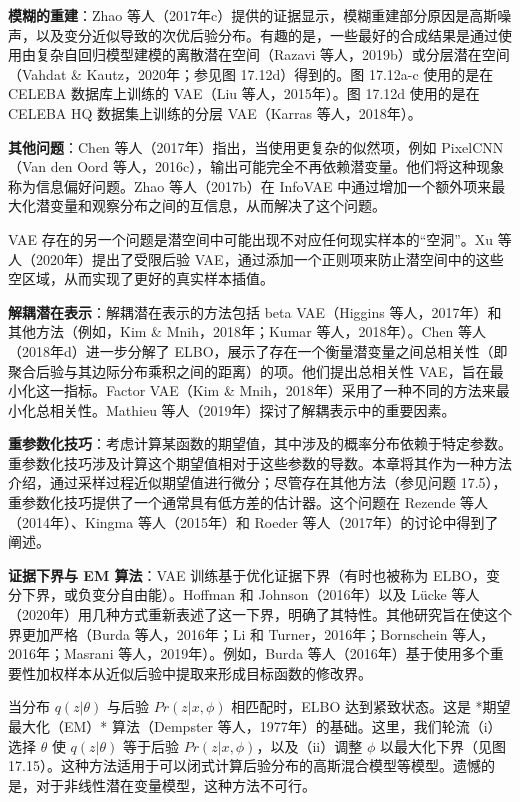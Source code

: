 \documentclass[lang=cn,newtx,10pt,scheme=chinese]{elegantbook}
\begin{document}
\textbf{模糊的重建}：Zhao 等人（2017年c）提供的证据显示，模糊重建部分原因是高斯噪声，以及变分近似导致的次优后验分布。有趣的是，一些最好的合成结果是通过使用由复杂自回归模型建模的离散潜在空间（Razavi 等人，2019b）或分层潜在空间（Vahdat \& Kautz，2020年；参见图 17.12d）得到的。图 17.12a-c 使用的是在 CELEBA 数据库上训练的 VAE（Liu 等人，2015年）。图 17.12d 使用的是在 CELEBA HQ 数据集上训练的分层 VAE（Karras 等人，2018年）。

\textbf{其他问题}：Chen 等人（2017年）指出，当使用更复杂的似然项，例如 PixelCNN（Van den Oord 等人，2016c），输出可能完全不再依赖潜变量。他们将这种现象称为信息偏好问题。Zhao 等人（2017b）在 InfoVAE 中通过增加一个额外项来最大化潜变量和观察分布之间的互信息，从而解决了这个问题。

VAE 存在的另一个问题是潜空间中可能出现不对应任何现实样本的“空洞”。Xu 等人（2020年）提出了受限后验 VAE，通过添加一个正则项来防止潜空间中的这些空区域，从而实现了更好的真实样本插值。

\textbf{解耦潜在表示}：解耦潜在表示的方法包括 beta VAE（Higgins 等人，2017年）和其他方法（例如，Kim \& Mnih，2018年；Kumar 等人，2018年）。Chen 等人（2018年d）进一步分解了 ELBO，展示了存在一个衡量潜变量之间总相关性（即聚合后验与其边际分布乘积之间的距离）的项。他们提出总相关性 VAE，旨在最小化这一指标。Factor VAE（Kim \& Mnih，2018年）采用了一种不同的方法来最小化总相关性。Mathieu 等人（2019年）探讨了解耦表示中的重要因素。

\textbf{重参数化技巧}：考虑计算某函数的期望值，其中涉及的概率分布依赖于特定参数。重参数化技巧涉及计算这个期望值相对于这些参数的导数。本章将其作为一种方法介绍，通过采样过程近似期望值进行微分；尽管存在其他方法（参见问题 17.5），重参数化技巧提供了一个通常具有低方差的估计器。这个问题在 Rezende 等人（2014年）、Kingma 等人（2015年）和 Roeder 等人（2017年）的讨论中得到了阐述。

\textbf{证据下界与 EM 算法}：VAE 训练基于优化证据下界（有时也被称为 ELBO，变分下界，或负变分自由能）。Hoffman 和 Johnson（2016年）以及 Lücke 等人（2020年）用几种方式重新表述了这一下界，明确了其特性。其他研究旨在使这个界更加严格（Burda 等人，2016年；Li 和 Turner，2016年；Bornschein 等人，2016年；Masrani 等人，2019年）。例如，Burda 等人（2016年）基于使用多个重要性加权样本从近似后验中提取来形成目标函数的修改界。

当分布 \(q(z|\theta)\) 与后验 \(Pr(z|x, \phi)\) 相匹配时，ELBO 达到紧致状态。这是 *期望最大化（EM）* 算法（Dempster 等人，1977年）的基础。这里，我们轮流（i）选择 \(\theta\) 使 \(q(z|\theta)\) 等于后验 \(Pr(z|x, \phi)\)，以及（ii）调整 \(\phi\) 以最大化下界（见图 17.15）。这种方法适用于可以闭式计算后验分布的高斯混合模型等模型。遗憾的是，对于非线性潜在变量模型，这种方法不可行。
\end{document}
